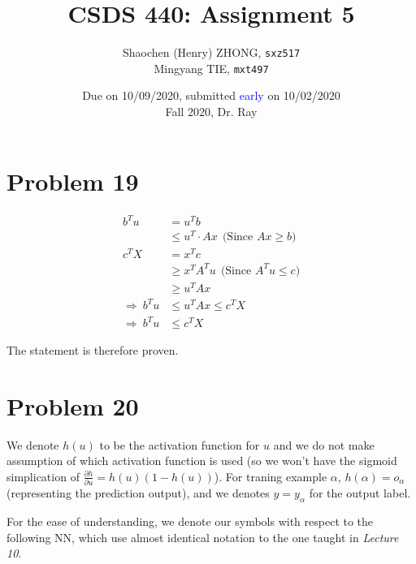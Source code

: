 \documentclass[12pt]{article}
\newcommand{\ilcode}{\texttt}
\begin{document}
\title{\textbf{CSDS 440: Assignment 5}}

\author{Shaochen (Henry) ZHONG, \ilcode{sxz517} \\ Mingyang TIE, \ilcode{mxt497}}
\date{Due on 10/09/2020, submitted \textcolor{blue}{early} on 10/02/2020 \\ Fall 2020, Dr. Ray}
\maketitle


\section{Problem 19}

\begin{align*}
    b^T u &= u^T b \\
    &\leq u^T \cdot Ax \ \ \text{(Since $Ax \geq b$)}\\
    c^T X &= x^T c \\
    &\geq x^T A^T u \ \ \text{(Since $A^T u \leq c$)}\\
    &\geq u^T Ax \\
    \Rightarrow \ b^T u &\leq u^T Ax \leq c^T X \\
    \Longrightarrow \ b^T u &\leq c^T X
\end{align*}

The statement is therefore proven.

\section{Problem 20}


We denote $h(u)$ to be the activation function for $u$ and we do not make assumption of which activation function is used (so we won't have the sigmoid simplication of $\frac{\partial h}{\partial u} = h(u)(1-h(u))$). For traning example $\alpha$, $h(\alpha) = o_\alpha$ (representing the prediction output), and we denotes $y = y_\alpha$ for the output label.

For the ease of understanding, we denote our symbols with respect to the following NN, which use almost identical notation to the one taught in \textit{Lecture 10}.\newline
\end{document}
